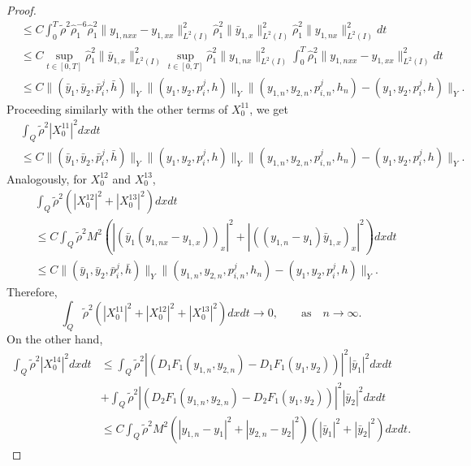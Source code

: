 \documentclass[11pt,a4paper]{amsart}
\numberwithin{equation}{section}
\begin{document}
\begin{proof}
\begin{equation*}
\begin{split}
            &\leq C \int_0^T \tilde\rho^{2} \hat\rho_1^{-6} \hat\rho_1^2 \|y_{1,nxx}-y_{1,xx}\|_{L^2(I)}^2 \hat\rho_1^2 \|\bar y_{1,x}\|_{L^2(I)}^2 \hat\rho_1^2 \|y_{1,nx}\|_{L^2(I)}^2 dt \\
            &\leq C \sup_{t\in[0,T]} \hat\rho_1^2 \|\bar y_{1,x}\|_{L^2(I)}^2 \sup_{t\in[0,T]} \hat\rho_1^2 \|y_{1,nx}\|_{L^2(I)}^2  \int_0^T \hat\rho_1^2 \|y_{1,nxx}-y_{1,xx}\|_{L^2(I)}^2 dt \\
            &\leq C \|(\bar y_1,\bar y_2,\bar p_i^j,\bar h)\|_{Y} \|(y_1,y_2,p_i^j,h)\|_{{Y}} \| (y_{1,n},y_{2,n},p_{i,n}^j,h_n) - (y_1,y_2,p_i^j,h) \|_{{Y}}.
        \end{split}
    \end{equation*}Proceeding similarly with the other terms of $X_0^{11}$, we get
    \begin{equation*}
        \begin{split}
                &\int_{Q} \tilde\rho^{2}|X_{0}^{11}|^{2} dxdt \\
                &\leq C \|(\bar y_1,\bar y_2,\bar p_i^j,\bar h)\|_{{Y}} \|(y_1,y_2,p_i^j,h)\|_{{Y}} \| (y_{1,n},y_{2,n},p_{i,n}^j,h_n) - (y_1,y_2,p_i^j,h) \|_{{Y}}.
        \end{split}
    \end{equation*}Analogously, for $X_0^{12}$ and $X_0^{13}$, 
    \begin{equation*}
        \begin{split}
            &\int_{Q} \tilde\rho^{2} (|X_{0}^{12}|^{2} + |X_{0}^{13}|^{2} )dxdt\\
            &\leq C\int_{Q} \tilde\rho^{2} M^2 \left( |(\bar y_1 (y_{1,nx}-y_{1,x}))_x|^2 + |((y_{1,n}-y_1) \bar y_{1,x})_x|^{2} \right) dxdt \\
            &\leq C\|(\bar y_1,\bar y_2,\bar p_i^j,\bar h)\|_{{Y}} \| (y_{1,n},y_{2,n},p_{i,n}^j,h_n) - (y_1,y_2,p_i^j,h) \|_{{Y}}.
        \end{split}
    \end{equation*}
    Therefore,
    \begin{equation*}
        \int_{Q} \tilde\rho^{2} (|X_{0}^{11}|^{2} + |X_{0}^{12}|^{2} + |X_{0}^{13}|^{2} )dxdt \to 0, \qquad\text{as}\quad n\to \infty.
    \end{equation*}
    On the other hand,
    \begin{equation*}
        \begin{split}
        	\int_{Q} \tilde\rho^{2} |X_{0}^{14}|^{2} dxdt&\leq  \int_{Q} \tilde\rho^{2} |(D_1 F_1(y_{1,n},y_{2,n})-D_1 F_1(y_1,y_2))|^2 |\bar y_1|^{2}dxdt\\
            & + \int_{Q} \tilde\rho^{2} |(D_2 F_1(y_{1,n},y_{2,n})-D_2 F_1(y_1,y_2))|^2 |\bar y_2|^{2}dxdt\\
        	&\leq C\int_{Q} \tilde\rho^{2} M^2 ( |y_{1,n}-y_1|^2 + |y_{2,n}-y_2|^2 ) (|\bar y_1|^{2} + |\bar y_2|^{2} ) dxdt.
        \end{split}
    \end{equation*}
    

\end{proof}
\end{document}
